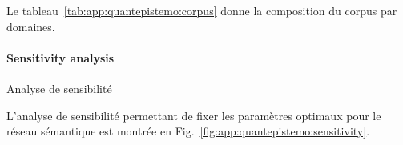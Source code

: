 Le tableau~\ref{tab:app:quantepistemo:corpus} donne la composition du corpus par domaines.






\paragraph{Sensitivity analysis}{Analyse de sensibilité}

L'analyse de sensibilité permettant de fixer les paramètres optimaux pour le réseau sémantique est montrée en Fig.~\ref{fig:app:quantepistemo:sensitivity}.



